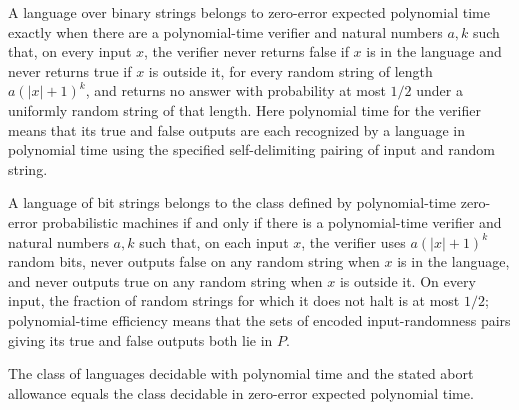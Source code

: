 \begin{theorem}
\label{Randomized.ZPP_PTM_eq_setOf_inZPP}
\leanok
{}
A language over binary strings belongs to zero-error expected polynomial time exactly
when there are a polynomial-time verifier and natural numbers $a,k$ such that, on every
input $x$, the verifier never returns false if $x$ is in the language and never returns
true if $x$ is outside it, for every random string of length $a(|x|+1)^k$, and returns
no answer with probability at most $1/2$ under a uniformly random string of that length.
Here polynomial time for the verifier means that its true and false outputs are each
recognized by a language in polynomial time using the specified self-delimiting pairing
of input and random string.
\end{theorem}

\begin{theorem}
\label{Randomized.mem_ZPP_PTM_iff}
\leanok
{}
A language of bit strings belongs to the class defined by polynomial-time zero-error
probabilistic machines if and only if there is a polynomial-time verifier and natural
numbers $a,k$ such that, on each input $x$, the verifier uses $a(|x|+1)^k$ random bits,
never outputs false on any random string when $x$ is in the language, and never outputs
true on any random string when $x$ is outside it. On every input, the fraction of random
strings for which it does not halt is at most $1/2$; polynomial-time efficiency means
that the sets of encoded input-randomness pairs giving its true and false outputs both
lie in $P$.
\end{theorem}

\begin{theorem}
\label{Randomized.ZPPAbort_PTM_eq_ZPP_PTM}
\leanok
{}
The class of languages decidable with polynomial time and the stated abort allowance
equals the class decidable in zero-error expected polynomial time.
\end{theorem}


